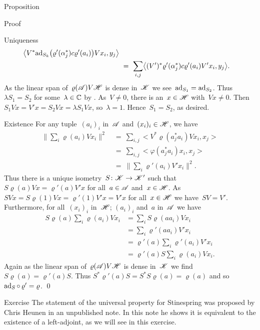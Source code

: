 \documentclass[b]{subfiles}
\begin{document}
\begin{parsec}
\begin{point}{Proposition}
\begin{point}{Proof}
\begin{point}{Uniqueness}
\begin{align*}
        \bigl< V^* \mathrm{ad}_{S_k} \bigl(\varrho'(\alpha_j^*) c
            \varrho'(a_i)\bigr) V x_i, y_j\bigr> \\
    & \ =\  \sum_{i,j}
        \bigl< (V')^* \varrho'(\alpha_j^*) c \varrho'(a_i) V' x_i, y_j
            \bigr>.
\end{align*}
As the linear span of~$\varrho(\mathscr{A}) V\mathscr{H}$ is dense in~$\mathscr{K}$
    we see~$\mathrm{ad}_{S_1} = \mathrm{ad}_{S_2}$.
Thus $\lambda S_1= S_2$ for some~$\lambda \in \mathbb{C}$ by \TODO{}.
As~$V \neq 0$, there is an~$x \in \mathscr{H}$ with~$Vx \neq 0$.
Then~$S_1 V x = V'x = S_2Vx = \lambda S_1 Vx$, so~$\lambda=1$.
Hence~$S_1=S_2$, as desired.
\end{point}
\begin{point}{Existence}%
For any tuple~$(a_i)_i$ in~$\mathscr{A}$ and~$(x_i)_i \in \mathscr{H}$, we have
\begin{align*}
\bigl\| \sum_i \varrho(a_i)Vx_i \bigr\|^2
&\ =\  \sum_{i,j} \bigl< V^* \varrho(a_j^*a_i) Vx_i, x_j\bigr> \\
&\ =\  \sum_{i,j} \bigl< \varphi(a_j^* a_i)x_i, x_j \bigr> \\
&\ =\  \bigl\| \sum_i \varrho'(a_i) V'x_i \bigr\|^2.
\end{align*}
Thus there is a unique isometry~$S\colon \mathscr{K} \to \mathscr{K}'$
    such that~$S\varrho(a) Vx = \varrho'(a)V' x$
        for all~$a\in \mathscr{A}$ and~$x \in\mathscr{H}$.
As~$SVx = S\varrho(1)Vx=\varrho'(1)V'x = V'x$ for all~$x\in \mathscr{H}$
    we have~$SV = V'$.
Furthermore, for all~$(x_i)_i$ in~$\mathscr{H}$;
    $(a_i)_i$ and~$a$ in~$\mathscr{A}$
we have
\begin{align*}
    S \varrho(a) \sum_i \varrho(a_i)Vx_i
    &= \sum_i S \varrho(aa_i) Vx_i \\
    &= \sum_i \varrho'(aa_i) V'x_i \\
    & = \varrho'(a) \sum_i \varrho'(a_i)V'x_i\\
    & = \varrho'(a) S \sum_i \varrho(a_i)V x_i.
\end{align*}
Again as the linear span of~$\varrho(\mathscr{A})V\mathscr{H}$
    is dense in~$\mathscr{K}$
    we find~$S \varrho(a) = \varrho'(a)S$.
Thus $S^* \varrho'(a) S = S^*S\varrho(a) = \varrho(a)$
    and so~$\mathrm{ad}_S \mathop{\circ} \varrho' = \varrho$. \qed
\end{point}
\end{point}
\end{point}
\begin{point}{Exercise}%
    The statement of the universal property
        for Stinespring
        was proposed by Chris Heunen in an unpublished note.
    In this note he shows it is equivalent to the existence
        of a left-adjoint, as we will see in this exercise.
    

\end{point}
\end{parsec}
\end{document}
